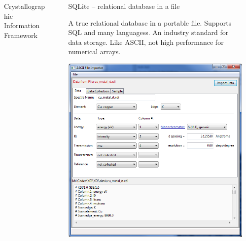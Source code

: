 \documentclass[final]{beamer}
\begin{document}
\begin{frame}{}
\begin{columns}[t]
\begin{column}{.34\linewidth}
\begin{block}{Crystallographic Information Framework}
         \vspace{10mm} {\ }  \vspace{10mm} {\ }

        \end{block}
      \end{column}
      \begin{column}{.01\linewidth}
      \end{column}
      \begin{column}{.31\linewidth}
        \begin{block}{SQLite -- relational database in a file}

          \justifying A true relational database in a portable file. Supports
          SQL and many languagess.  An industry standard for
          data storage. Like ASCII, not high performance for numerical
          arrays.

         \vspace{6mm}

         \begin{center}
           \includegraphics[width=0.7\linewidth]{sqlite.png}
         \end{center}

         \vspace{10mm} {\ }   \vspace{10mm} {\ }


        \end{block}
      \end{column}
      \begin{column}{.01\linewidth}
      \end{column}

    \end{columns}
  \end{frame}
\end{document}
